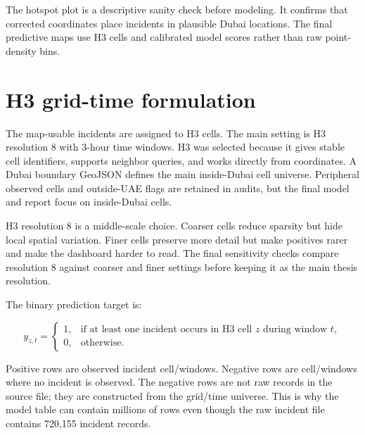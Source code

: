 The hotspot plot is a descriptive sanity check before modeling. It confirms that corrected coordinates place incidents in plausible Dubai locations. The final predictive maps use H3 cells and calibrated model scores rather than raw point-density bins.

\FloatBarrier

\section{H3 grid-time formulation}

The map-usable incidents are assigned to H3 cells. The main setting is H3 resolution 8 with 3-hour time windows. H3 was selected because it gives stable cell identifiers, supports neighbor queries, and works directly from coordinates. A Dubai boundary GeoJSON defines the main inside-Dubai cell universe. Peripheral observed cells and outside-UAE flags are retained in audits, but the final model and report focus on inside-Dubai cells.

H3 resolution 8 is a middle-scale choice. Coarser cells reduce sparsity but hide local spatial variation. Finer cells preserve more detail but make positives rarer and make the dashboard harder to read. The final sensitivity checks compare resolution 8 against coarser and finer settings before keeping it as the main thesis resolution.

The binary prediction target is:

\[
y_{z,t} =
\begin{cases}
1, & \text{if at least one incident occurs in H3 cell } z \text{ during window } t,\\
0, & \text{otherwise.}
\end{cases}
\]

Positive rows are observed incident cell/windows. Negative rows are cell/windows where no incident is observed. The negative rows are not raw records in the source file; they are constructed from the grid/time universe. This is why the model table can contain millions of rows even though the raw incident file contains 720,155 incident records.

